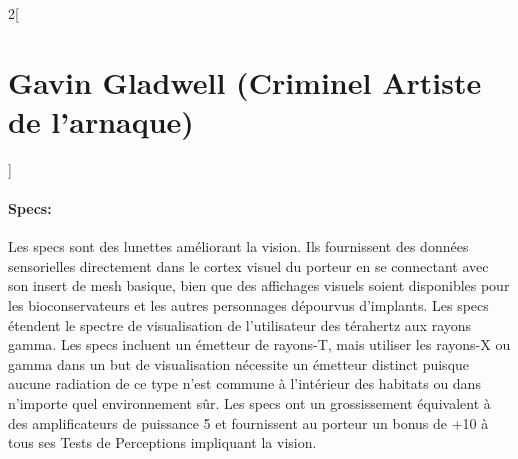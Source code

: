 \documentclass[a4paper,9pt]{article}
\begin{document}
\begin{multicols}{2}[\section*{Gavin Gladwell (Criminel Artiste de l'arnaque)}]
\paragraph{Specs:} Les specs sont des lunettes améliorant la vision. Ils
fournissent des données sensorielles directement dans le cortex visuel
du porteur en se connectant avec son insert de mesh basique, bien que
des affichages visuels soient disponibles pour les bioconservateurs et les
autres personnages dépourvus d'implants. Les specs étendent le spectre de
visualisation de l'utilisateur des térahertz aux rayons gamma. Les
specs incluent un émetteur de rayons-T, mais utiliser les rayons-X ou
gamma dans un but de visualisation nécessite un émetteur distinct puisque
aucune radiation de ce type n'est commune à l'intérieur des habitats ou dans
n'importe quel environnement sûr. Les specs ont un grossissement équivalent à
des amplificateurs de puissance 5 et fournissent au porteur un bonus de +10 à
tous ses Tests de Perceptions impliquant la vision.


\end{multicols}
\end{document}
